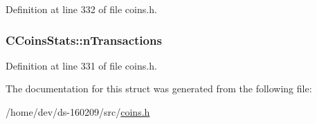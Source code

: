 Definition at line 332 of file coins.\+h.

\hypertarget{struct_c_coins_stats_a0b04da159443c350e9b9e8a39c6a82db}{}
\subsubsection[{n\+Transactions}]{ C\+Coins\+Stats\+::n\+Transactions}\label{struct_c_coins_stats_a0b04da159443c350e9b9e8a39c6a82db}


Definition at line 331 of file coins.\+h.



The documentation for this struct was generated from the following file\+:\begin{DoxyCompactItemize}
\item 
/home/dev/ds-\/160209/src/\hyperlink{coins_8h}{coins.\+h}\end{DoxyCompactItemize}

